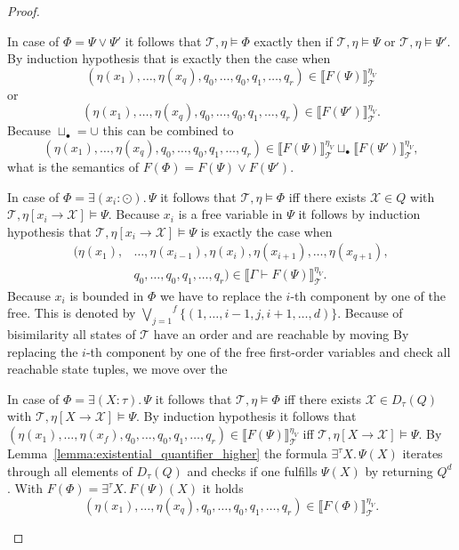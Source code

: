 \begin{proof}
\begin{compactitem}
        \item In case of $\Phi = \Psi \vee \Psi'$ it follows that $\mathcal{T}, \eta \models \Phi$ exactly then if
        $\mathcal{T}, \eta \models \Psi$ or $\mathcal{T}, \eta \models \Psi'$. By induction hypothesis that is
        exactly then the case when
        \[(\eta(x_1), \dots, \eta(x_q), q_0, \dots, q_0, q_1, \dots, q_r) \in \llbracket F
        (\Psi) \rrbracket^{\eta_V}_\mathcal{T}\]
        or
        \[(\eta(x_1), \dots, \eta(x_q), q_0, \dots, q_0, q_1, \dots, q_r) \in \llbracket F
        (\Psi') \rrbracket^{\eta_V}_\mathcal{T}.\]
        Because $\sqcup_{\bullet} = \cup$ this can be combined to
        \[(\eta(x_1), \dots, \eta(x_q), q_0, \dots, q_0, q_1, \dots, q_r) \in \llbracket F
        (\Psi) \rrbracket^{\eta_V}_\mathcal{T} \sqcup_\bullet \llbracket F
        (\Psi') \rrbracket^{\eta_V}_\mathcal{T},\]
        what is the semantics of $F(\Phi) = F(\Psi) \vee F(\Psi')$.

        \item In case of $\Phi = \exists (x_i\colon \odot).\,\Psi$ it follows that $\mathcal{T}, \eta \models \Phi$ iff
        there exists  $\mathcal{X} \in Q$ with $\mathcal{T}, \eta[x_i \rightarrow \mathcal{X}] \models \Psi$. Because
        $x_i$ is a free variable in $\Psi$ it follows by induction hypothesis that $\mathcal{T}, \eta[x_i
        \rightarrow \mathcal{X}] \models \Psi$ is exactly the case when
        \begin{align*}
            (\eta(x_1),& \dots, \eta(x_{i-1}), \eta(x_i), \eta(x_{i+1}), \dots, \eta(x_{q+1}),\\& q_0, \dots, q_0, q_1, \dots, q_r) \in
            \llbracket \Gamma \vdash F(\Psi) \rrbracket^{\eta_V}_\mathcal{T}.
        \end{align*}
        Because $x_i$ is bounded in $\Phi$ we have to replace the $i$-th component by one of the free. This is
        denoted by $\overset{f}{\underset{j=1}{\bigvee}} \{(1, \dots, i-1, j, i+1, \dots, d)\}$.
        Because of bisimilarity all states of $\mathcal{T}$ have an order and are reachable by moving
        By replacing the $i$-th component by one of the free first-order variables and check all reachable state
        tuples, we move over the

        \item In case of $\Phi = \exists (X \colon \tau).\,\Psi$ it follows that $\mathcal{T}, \eta \models \Phi$ iff
        there exists $\mathcal{X} \in D_\tau(Q)$ with $\mathcal{T}, \eta[X \rightarrow \mathcal {X}] \models \Psi$.
        By induction hypothesis it follows that $(\eta(x_1), \dots, \eta(x_{f}), q_0, \dots, q_0, q_1, \dots, q_r) \in
        \llbracket F(\Psi) \rrbracket^{\eta_V}_\mathcal{T}$ iff $\mathcal{T}, \eta[X
        \rightarrow \mathcal {X}] \models \Psi$. By Lemma~\ref{lemma:existential_quantifier_higher} the formula
        $\exists^\tau X.\, \Psi(X)$ iterates through all elements of $D_\tau(Q)$ and checks if one fulfills $\Psi(X)$
        by returning $Q^d$.
        With $F(\Phi) = \exists^\tau X.\, F(\Psi)(X)$ it holds \[(\eta(x_1), \dots, \eta(x_{q}), q_0, \dots, q_0, q_1, \dots, q_r) \in
        \llbracket F(\Phi) \rrbracket^{\eta_V}_\mathcal{T}.\]


\end{compactitem}
\end{proof}
